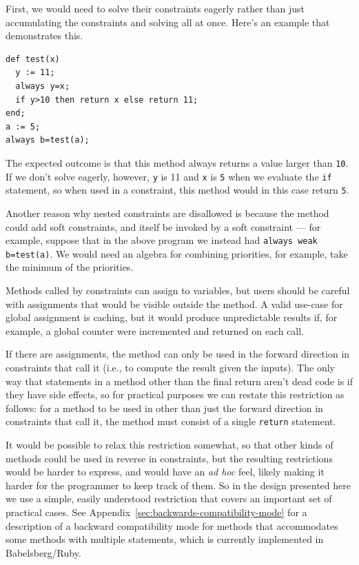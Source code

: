 \documentclass{article}
\begin{document}
First, we would need to solve their constraints eagerly rather than
just accumulating the constraints and solving all at once.  Here's an
example that demonstrates this.

\begin{verbatim}
def test(x)
  y := 11;
  always y=x;
  if y>10 then return x else return 11;
end;
a := 5;
always b=test(a);
\end{verbatim}
The expected outcome is that this method always returns a value larger
than \verb|10|. If we don't solve eagerly, however, \verb|y| is 11 and
\verb|x| is \verb|5| when we evaluate the \verb|if| statement, so when
used in a constraint, this method would in this case return \verb|5|.

Another reason why nested constraints are disallowed is because the
method could add soft constraints, and itself be invoked by a soft
constraint --- for example, suppose that in the above program we
instead had \verb|always weak b=test(a)|.  We would need an algebra
for combining priorities, for example, take the minimum of the
priorities.

Methods called by constraints can assign to variables, but users
should be careful with assignments that would be visible outside the
method. A valid use-case for global assignment is caching, but it
would produce unpredictable results if, for example, a global counter
were incremented and returned on each call.

If there are assignments, the method can only be used in the forward
direction in constraints that call it (i.e., to compute the result
given the inputs). The only way that statements in a method other than
the final return aren't dead code is if they have side effects, so for
practical purposes we can restate this restriction as follows: for a
method to be used in other than just the forward direction in
constraints that call it, the method must consist of a single
\verb|return| statement.

It would be possible to relax this restriction somewhat, so that other
kinds of methods could be used in reverse in constraints, but the
resulting restrictions would be harder to express, and would have an
\emph{ad hoc} feel, likely making it harder for the programmer to keep
track of them.  So in the design presented here we use a simple,
easily understood restriction that covers an important set of
practical cases.  See Appendix~\ref{sec:backwards-compatibility-mode}
for a description of a backward compatibility mode for methods that
accommodates some methods with multiple statements, which is currently
implemented in Babelsberg/Ruby.
\end{document}
